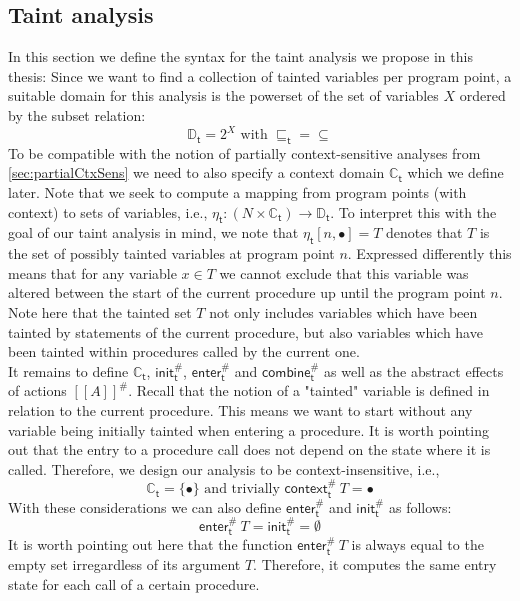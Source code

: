     \subsection{Taint analysis}\label{sec:formalTaint}
      In this section we define the syntax for the taint analysis we propose in this thesis: Since we want to find a collection of tainted variables per program point, a suitable domain for this analysis is the powerset of the set of variables $X$ ordered by the subset relation:
      \[\mathbb{D}_\textsf{t} = 2^X \text{ with } \sqsubseteq_\textsf{t} = \subseteq\]
      To be compatible with the notion of partially context-sensitive analyses from \autoref{sec:partialCtxSens} we need to also specify a context domain $\mathbb{C}_\textsf{t}$ which we define later.
      Note that we seek to compute a mapping from program points (with context) to sets of variables, i.e., $\eta_\textsf{t}: (N \times \mathbb{C}_\textsf{t}) \rightarrow \mathbb{D}_\textsf{t}$. To interpret this with the goal of our taint analysis in mind, we note that $\eta_\textsf{t} [n, \bullet] = T$ denotes that $T$ is the set of possibly tainted variables at program point $n$. Expressed differently this means that for any variable $x \in T$ we cannot exclude that this variable was altered between the start of the current procedure up until the program point $n$. Note here that the tainted set $T$ not only includes variables which have been tainted by statements of the current procedure, but also variables which have been tainted within procedures called by the current one.\\
      It remains to define $\mathbb{C}_\textsf{t}$, $\textsf{init}^{\#}_\textsf{t}$, $\textsf{enter}^{\#}_\textsf{t}$ and $\textsf{combine}^{\#}_\textsf{t}$ as well as the abstract effects of actions $[\![ A ]\!]^{\#}$. Recall that the notion of a "tainted" variable is defined in relation to the current procedure. This means we want to start without any variable being initially tainted when entering a procedure. It is worth pointing out that the entry to a procedure call does not depend on the state where it is called. Therefore, we design our analysis to be context-insensitive, i.e., 
      \[\mathbb{C}_\textsf{t} = \{\bullet\} \text{ and trivially } \textsf{context}^{\#}_\textsf{t}\ T = \bullet\]
      With these considerations we can also define $\textsf{enter}^{\#}_\textsf{t}$ and $\textsf{init}^{\#}_\textsf{t}$ as follows:
      \[\textsf{enter}^{\#}_\textsf{t}\ T = \textsf{init}^{\#}_\textsf{t} = \emptyset\]
      It is worth pointing out here that the function $\textsf{enter}^{\#}_\textsf{t}\ T$ is always equal to the empty set irregardless of its argument $T$. Therefore, it computes the same entry state for each call of a certain procedure.\\
